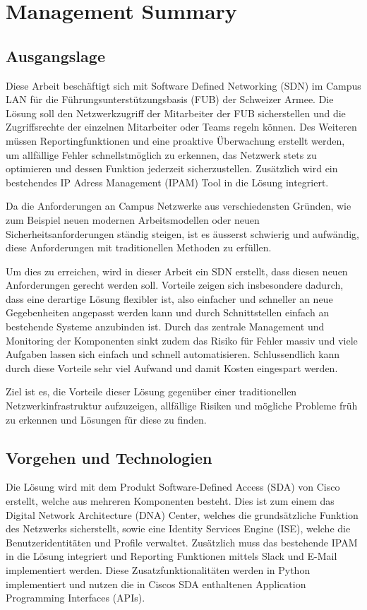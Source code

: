 \section{Management Summary}

\subsection{Ausgangslage}
Diese Arbeit beschäftigt sich mit Software Defined Networking (SDN) im Campus LAN für die Führungsunterstützungsbasis (FUB) der Schweizer Armee. Die Lösung soll den Netzwerkzugriff der Mitarbeiter der FUB sicherstellen und die Zugriffsrechte der einzelnen Mitarbeiter oder Teams regeln können. 
Des Weiteren müssen Reportingfunktionen und eine proaktive Überwachung erstellt werden, um allfällige Fehler schnellstmöglich zu erkennen, das Netzwerk stets zu optimieren und dessen Funktion jederzeit sicherzustellen.
Zusätzlich wird ein bestehendes IP Adress Management (IPAM) Tool in die Lösung integriert.

Da die Anforderungen an Campus Netzwerke aus verschiedensten Gründen, wie zum Beispiel neuen modernen Arbeitsmodellen oder neuen Sicherheitsanforderungen ständig steigen, ist es äusserst schwierig und aufwändig, diese Anforderungen mit traditionellen Methoden zu erfüllen. 

Um dies zu erreichen, wird in dieser Arbeit ein SDN erstellt, dass diesen neuen Anforderungen gerecht werden soll. Vorteile zeigen sich insbesondere dadurch, dass eine derartige Lösung flexibler ist, also einfacher und schneller an neue Gegebenheiten angepasst werden kann und durch Schnittstellen einfach an bestehende Systeme anzubinden ist. Durch das zentrale Management und Monitoring der Komponenten sinkt zudem das Risiko für Fehler massiv und viele Aufgaben lassen sich einfach und schnell automatisieren.
Schlussendlich kann durch diese Vorteile sehr viel Aufwand und damit Kosten eingespart werden.

Ziel ist es, die Vorteile dieser Lösung gegenüber einer traditionellen Netzwerkinfrastruktur aufzuzeigen, allfällige Risiken und mögliche Probleme früh zu erkennen und Lösungen für diese zu finden. 
\subsection{Vorgehen und Technologien}
Die Lösung wird mit dem Produkt Software-Defined Access (SDA) von Cisco erstellt, welche aus mehreren Komponenten besteht. Dies ist zum einem das Digital Network Architecture (DNA) Center, welches die grundsätzliche Funktion des Netzwerks sicherstellt, sowie eine Identity Services Engine (ISE), welche die Benutzeridentitäten und Profile verwaltet.
Zusätzlich muss das bestehende IPAM in die Lösung integriert und Reporting Funktionen mittels Slack und E-Mail implementiert werden. Diese Zusatzfunktionalitäten werden in Python implementiert und nutzen die in Ciscos SDA enthaltenen Application Programming Interfaces (APIs).
